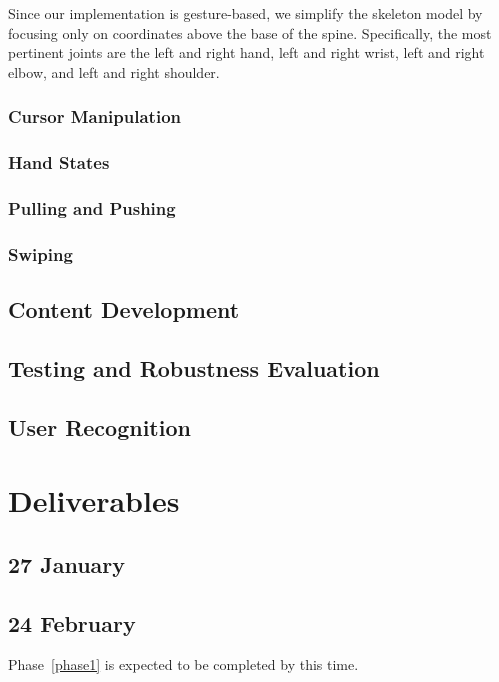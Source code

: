 \documentclass{scrartcl}
\begin{document}
      Since our implementation is gesture-based, we simplify the skeleton model by focusing only on coordinates above the base of the spine. Specifically, the most pertinent joints are the left and right hand, left and right wrist, left and right elbow, and left and right shoulder.
      \subsubsection{Cursor Manipulation}
      \subsubsection{Hand States}
      \subsubsection{Pulling and Pushing}
      \subsubsection{Swiping}
    \subsection{Content Development\label{phase4}}
    \subsection{Testing and Robustness Evaluation\label{phase5}}
    \subsection{User Recognition\label{phase6}}
  \section{Deliverables}
    \subsection{27 January}
    \subsection{24 February}
      Phase~\ref{phase1} is expected to be completed by this time.
\end{document}
